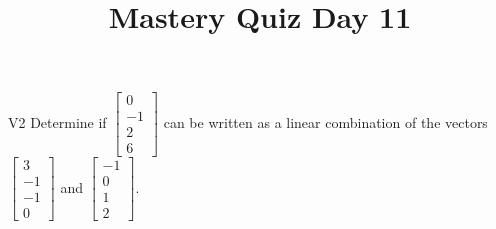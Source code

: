 \documentclass{sbgLAquiz}
\title{Mastery Quiz Day 11 }
\begin{document}
\begin{problem}{V2}
Determine if $\begin{bmatrix}0 \\ -1 \\ 2 \\ 6 \end{bmatrix}$ can be written as a linear combination of the vectors $\begin{bmatrix} 3 \\ -1 \\ -1 \\ 0 \end{bmatrix}$ and $\begin{bmatrix} -1 \\ 0 \\ 1 \\ 2 \end{bmatrix}$.
\end{problem}
\end{document}
